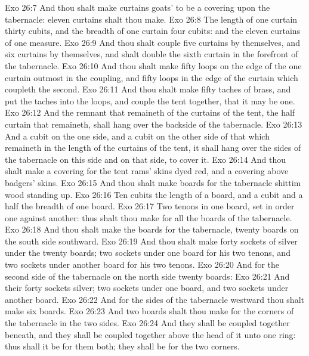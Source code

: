 \vs Exo 26:7 And thou shalt make curtains  goats'  to be a covering upon the tabernacle: eleven curtains shalt thou make.
\vs Exo 26:8 The length of one curtain  thirty cubits, and the breadth of one curtain four cubits: and the eleven curtains  of one measure.
\vs Exo 26:9 And thou shalt couple five curtains by themselves, and six curtains by themselves, and shalt double the sixth curtain in the forefront of the tabernacle.
\vs Exo 26:10 And thou shalt make fifty loops on the edge of the one curtain  outmost in the coupling, and fifty loops in the edge of the curtain which coupleth the second.
\vs Exo 26:11 And thou shalt make fifty taches of brass, and put the taches into the loops, and couple the tent together, that it may be one.
\vs Exo 26:12 And the remnant that remaineth of the curtains of the tent, the half curtain that remaineth, shall hang over the backside of the tabernacle.
\vs Exo 26:13 And a cubit on the one side, and a cubit on the other side of that which remaineth in the length of the curtains of the tent, it shall hang over the sides of the tabernacle on this side and on that side, to cover it.
\vs Exo 26:14 And thou shalt make a covering for the tent  rams' skins dyed red, and a covering above  badgers' skins.
\vs Exo 26:15 And thou shalt make boards for the tabernacle  shittim wood standing up.
\vs Exo 26:16 Ten cubits  the length of a board, and a cubit and a half  the breadth of one board.
\vs Exo 26:17 Two tenons  in one board, set in order one against another: thus shalt thou make for all the boards of the tabernacle.
\vs Exo 26:18 And thou shalt make the boards for the tabernacle, twenty boards on the south side southward.
\vs Exo 26:19 And thou shalt make forty sockets of silver under the twenty boards; two sockets under one board for his two tenons, and two sockets under another board for his two tenons.
\vs Exo 26:20 And for the second side of the tabernacle on the north side  twenty boards:
\vs Exo 26:21 And their forty sockets  silver; two sockets under one board, and two sockets under another board.
\vs Exo 26:22 And for the sides of the tabernacle westward thou shalt make six boards.
\vs Exo 26:23 And two boards shalt thou make for the corners of the tabernacle in the two sides.
\vs Exo 26:24 And they shall be coupled together beneath, and they shall be coupled together above the head of it unto one ring: thus shall it be for them both; they shall be for the two corners.

